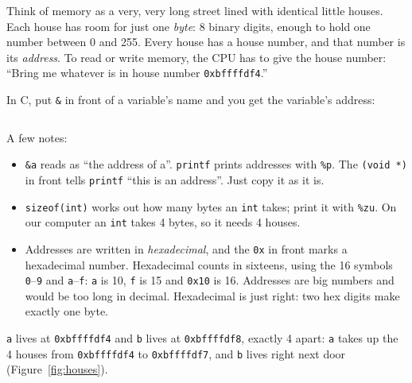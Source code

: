 Think of memory as a very, very long street lined with identical little houses. Each house has room for just one \emph{byte}: 8 binary digits, enough to hold one number between 0 and 255. Every house has a house number, and that number is its \emph{address}. To read or write memory, the CPU has to give the house number: ``Bring me whatever is in house number \texttt{0xbffffdf4}.''

In C, put \texttt{\&} in front of a variable's name and you get the variable's address:


\inputminted[linenos=false]{text}{code/en/ch04/out/addr.txt}

A few notes:
\begin{itemize}
  \item \texttt{\&a} reads as ``the address of a''. \texttt{printf} prints addresses with \texttt{\%p}. The \texttt{(void *)} in front tells \texttt{printf} ``this is an address''. Just copy it as it is.
  \item \texttt{sizeof(int)} works out how many bytes an \texttt{int} takes; print it with \texttt{\%zu}. On our computer an \texttt{int} takes 4 bytes, so it needs 4 houses.
  \item Addresses are written in \emph{hexadecimal}, and the \texttt{0x} in front marks a hexadecimal number. Hexadecimal counts in sixteens, using the 16 symbols \texttt{0}--\texttt{9} and \texttt{a}--\texttt{f}: \texttt{a} is 10, \texttt{f} is 15 and \texttt{0x10} is 16. Addresses are big numbers and would be too long in decimal. Hexadecimal is just right: two hex digits make exactly one byte.
\end{itemize}

\texttt{a} lives at \texttt{0xbffffdf4} and \texttt{b} lives at \texttt{0xbffffdf8}, exactly 4 apart: \texttt{a} takes up the 4 houses from \texttt{0xbffffdf4} to \texttt{0xbffffdf7}, and \texttt{b} lives right next door (Figure~\ref{fig:houses}).

